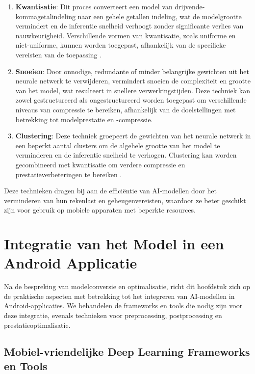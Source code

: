 \begin{enumerate}
    \item \textbf{Kwantisatie}: Dit proces converteert een model van drijvende-komma\-getal\-in\-de\-ling naar een gehele getallen indeling, wat de modelgrootte vermindert en de inferentie snelheid verhoogt zonder significante verlies van nauwkeurigheid. Verschillende vormen van kwantisatie, zoals uniforme en niet-uniforme, kunnen worden toegepast, afhankelijk van de specifieke vereisten van de toepassing \autocite{Wang2022}.
    
    \item \textbf{Snoeien}: Door onnodige, redundante of minder belangrijke gewichten uit het neurale netwerk te verwijderen, vermindert snoeien de complexiteit en grootte van het model, wat resulteert in snellere verwerkingstijden. Deze techniek kan zowel gestructureerd als ongestructureerd worden toegepast om verschillende niveaus van compressie te bereiken, afhankelijk van de doelstellingen met betrekking tot modelprestatie en -compressie.
    
    \item \textbf{Clustering}: Deze techniek groepeert de gewichten van het neurale netwerk in een beperkt aantal clusters om de algehele grootte van het model te verminderen en de inferentie snelheid te verhogen. Clustering kan worden gecombineerd met kwantisatie om verdere compressie en prestatieverbeteringen te bereiken \autocite{Ye2018}.
\end{enumerate}

Deze technieken dragen bij aan de efficiëntie van AI-modellen door het verminderen van hun rekenlast en geheugenvereisten, waardoor ze beter geschikt zijn voor gebruik op mobiele apparaten met beperkte resources.


\section{Integratie van het Model in een Android Applicatie}

Na de bespreking van modelconversie en optimalisatie, richt dit hoofdstuk zich op de praktische aspecten met betrekking tot het integreren van AI-modellen in Android-applicaties. We behandelen de frameworks en tools die nodig zijn voor deze integratie, evenals technieken voor preprocessing, postprocessing en prestatieoptimalisatie.

\subsection{Mobiel-vriendelijke Deep Learning Frameworks en Tools}

